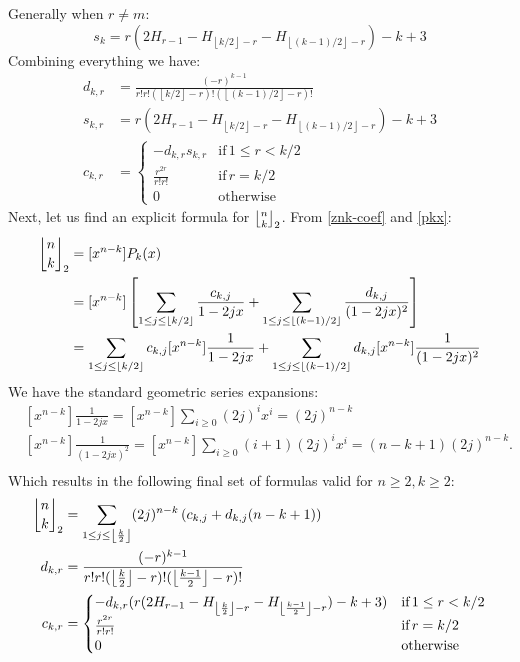 \documentclass[a4paper]{amsart}
\newcommand{\mStirling}[0]{\genfrac{\lfloor}{\rfloor}{0pt}{}}
\newcommand{\floor}[1]{\left\lfloor #1 \right\rfloor}
\begin{document}
Generally when $r \neq m$:
\begin{equation}\label{s-k}
    s_k = r(2H_{r-1}-H_{\floor{k/2}-r}-H_{\floor{(k-1)/2}-r})-k+3
\end{equation}
Combining everything we have:
\begin{equation}\label{d-s-c}
    \begin{aligned}
        d_{k,r} &= \frac{(-r)^{k-1}}{r!r!(\floor{k/2}-r)!(\floor{(k-1)/2}-r)!} \\
        s_{k,r} &= r(2H_{r-1}-H_{\floor{k/2}-r}-H_{\floor{(k-1)/2}-r})-k+3 \\
        c_{k,r} &= 
        \begin{cases}
            - d_{k,r} s_{k,r} & \text{if}\, 1 \leq r < k/2\\
            \frac{r^{2r}}{r!r!} & \text{if}\, r = k/2\\
            0 & \text{otherwise}
        \end{cases} 
    \end{aligned}
\end{equation}
Next, let us find an explicit formula for $\mStirling{n}{k}_2$. From \ref{znk-coef} and \ref{pkx}:
$$
\begin{aligned}
    \mStirling{n}{k}_2 &=[x^{n-k}]P_k(x) \\
    &= [x^{n-k}]\left[ \sum_{1 \leq j \leq \floor{k/2}} \frac{c_{k,j}}{1-2jx} + \sum_{1 \leq j \leq \floor{(k-1)/2}} \frac{d_{k,j}}{(1-2jx)^2} \right]\\
     &= \sum_{1 \leq j \leq \floor{k/2}}c_{k,j}[x^{n-k}]  \frac{1}{1-2jx} + \sum_{1 \leq j \leq \floor{(k-1)/2}} d_{k,j}[x^{n-k}]\frac{1}{(1-2jx)^2} \\ 
\end{aligned}
$$
We have the standard geometric series expansions:
$$
\begin{aligned}
     & [x^{n-k}]\frac{1}{1-2jx} = [x^{n-k}]\sum_{i\geq0}(2j)^ix^i = (2j)^{n-k}\\ 
     & [x^{n-k}]\frac{1}{(1-2jx)^2} = [x^{n-k}]\sum_{i\geq0}(i+1)(2j)^ix^i = (n-k+1)(2j)^{n-k}.\\ 
\end{aligned}
$$
Which results in the following final set of formulas valid for $n \geq 2, k \geq 2$:
\begin{equation}\label{z-d-c}
    \begin{aligned}
        \mStirling{n}{k}_2 &= \sum_{1 \leq j \leq \floor{\frac{k}{2}}}(2j)^{n-k}\left (c_{k,j} +d_{k,j}(n-k+1) \right )\\
            d_{k,r} &= \frac{(-r)^{k-1}}{r!r!(\floor{\frac{k}{2}}-r)!(\floor{\frac{k-1}{2}}-r)!} \\
            c_{k,r} &= \begin{cases}
                - d_{k,r} (r(2H_{r-1}-H_{\floor{\frac{k}{2}}-r}-H_{\floor{\frac{k-1}{2}}-r})-k+3) & \text{if} \, 1 \leq r < k/2\\
                \frac{r^{2r}}{r!r!} & \text{if}  \, r = k/2\\
                0 & \text{otherwise}
            \end{cases} 
    \end{aligned}
\end{equation}
\end{document}
